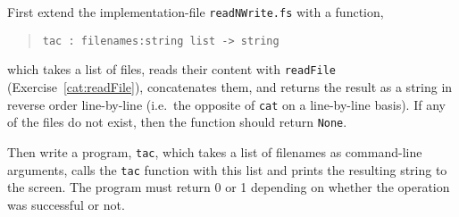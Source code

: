 First extend the implementation-file \lstinline{readNWrite.fs} with a function,
\begin{quote}
  \mbox{\lstinline!tac : filenames:string list -> string!}
\end{quote}
which takes a list of files, reads their content with
\lstinline{readFile} (Exercise~\ref{cat:readFile}), concatenates them,
and returns the result as a string in reverse order line-by-line
(i.e.\ the opposite of \lstinline{cat} on a line-by-line basis).  If any of the
files do not exist, then the function should return \lstinline{None}.

Then write a program, \lstinline[language=console]{tac}, which takes a
list of filenames as command-line arguments, calls the \lstinline{tac}
function with this list and prints the resulting string to the screen. The
program must return 0 or 1 depending on whether the operation was
successful or not.
